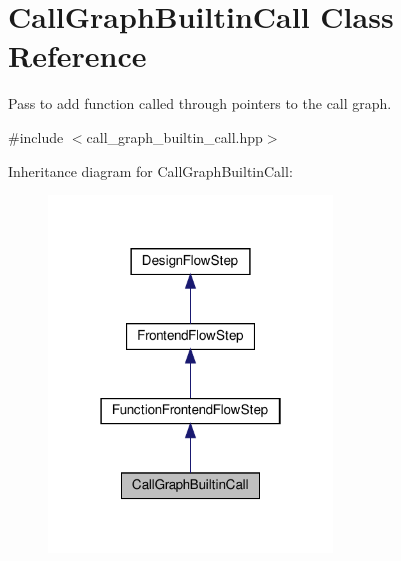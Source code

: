 \hypertarget{classCallGraphBuiltinCall}{}\section{Call\+Graph\+Builtin\+Call Class Reference}
\label{classCallGraphBuiltinCall}


Pass to add function called through pointers to the call graph.  




{\ttfamily \#include $<$call\+\_\+graph\+\_\+builtin\+\_\+call.\+hpp$>$}



Inheritance diagram for Call\+Graph\+Builtin\+Call\+:
\nopagebreak
\begin{figure}[H]
\begin{center}
\leavevmode
\includegraphics[width=214pt]{d6/d86/classCallGraphBuiltinCall__inherit__graph}
\end{center}
\end{figure}


